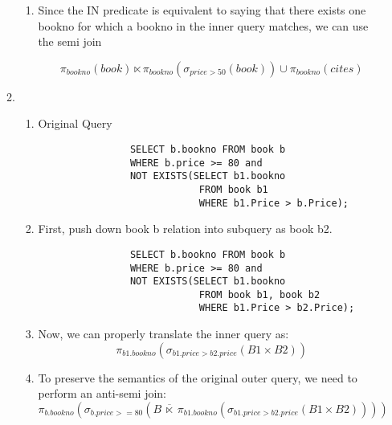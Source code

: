 \documentclass{article}
\begin{document}
\begin{enumerate}
\begin{enumerate}
\begin{enumerate}
            \item Since the IN predicate is equivalent to saying that there exists one bookno for which a bookno in the inner query matches, we can use the semi join

            \begin{displaymath}
                \pi_{bookno}(book) \ltimes \pi_{bookno}(\sigma_{price > 50}(book)) \cup \pi_{bookno}(cites)
            \end{displaymath}

        \end{enumerate}

        \item %

        \begin{enumerate}
            \item Original Query
            \begin{lstlisting}
                SELECT b.bookno FROM book b
                WHERE b.price >= 80 and
                NOT EXISTS(SELECT b1.bookno
                            FROM book b1
                            WHERE b1.Price > b.Price);
            \end{lstlisting}

            \item First, push down book b relation into subquery as book b2.
            \begin{lstlisting}
                SELECT b.bookno FROM book b
                WHERE b.price >= 80 and
                NOT EXISTS(SELECT b1.bookno
                            FROM book b1, book b2
                            WHERE b1.Price > b2.Price);
            \end{lstlisting}

            \item Now, we can properly translate the inner query as:
            \begin{displaymath}
                \pi_{b1.bookno}(\sigma_{b1.price>b2.price}(B1 \times B2))
            \end{displaymath}

            \item To preserve the semantics of the original outer query, we need to perform an anti-semi join:
            \begin{displaymath}
                \pi_{b.bookno}(\sigma_{b.price >= 80}(B \ \overline{\ltimes}\ \pi_{b1.bookno}(\sigma_{b1.price>b2.price}(B1 \times B2))))
            \end{displaymath}


\end{enumerate}
\end{enumerate}
\end{enumerate}
\end{document}
